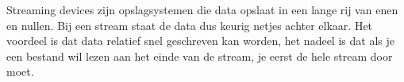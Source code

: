 Streaming devices zijn opslagsystemen die data opslaat in een lange rij van enen en nullen. Bij een stream staat de data dus keurig netjes achter elkaar. Het voordeel is dat data relatief snel geschreven kan worden, het nadeel is dat als je een bestand wil lezen aan het einde van de stream, je eerst de hele stream door moet.

